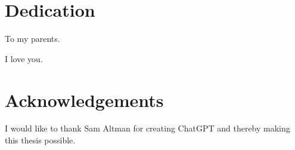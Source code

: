 \chapter*{Dedication}
\begin{center}
To my parents.

I love you.
\end{center}

\chapter*{Acknowledgements}
I would like to thank Sam Altman for creating ChatGPT and thereby making this thesis possible.
